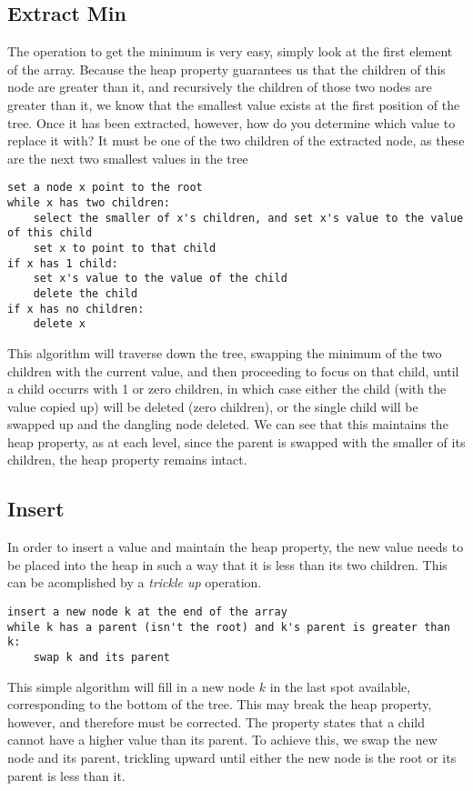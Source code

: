 \documentclass[titlepage]{article}
\numberwithin{equation}{subsection}
\begin{document}
\subsection{Extract Min}
The operation to get the minimum is very easy, simply look at the first element of the array. Because the
heap property guarantees us that the children of this node are greater than it, and recursively the children
of those two nodes are greater than it, we know that the smallest value exists at the first position of the
tree. Once it has been extracted, however, how do you determine which value to replace it with? It must be
one of the two children of the extracted node, as these are the next two smallest values in the tree
\begin{minipage}{\linewidth}
\begin{lstlisting}
set a node x point to the root
while x has two children:
    select the smaller of x's children, and set x's value to the value of this child
    set x to point to that child
if x has 1 child:
    set x's value to the value of the child
    delete the child
if x has no children:
    delete x
\end{lstlisting}
\end{minipage}
This algorithm will traverse down the tree, swapping the minimum of the two children with the current value,
and then proceeding to focus on that child, until a child occurrs with 1 or zero children, in which case either
the child (with the value copied up) will be deleted (zero children), or the single child will be swapped up
and the dangling node deleted. We can see that this maintains the heap property, as at each level, since the
parent is swapped with the smaller of its children, the heap property remains intact. 
\subsection{Insert}
In order to insert a value and maintain the heap property, the new value needs to be placed into the heap
in such a way that it is less than its two children. This can be acomplished by a \textit{trickle up} operation.
\begin{lstlisting}
insert a new node k at the end of the array
while k has a parent (isn't the root) and k's parent is greater than k:
    swap k and its parent
\end{lstlisting}
This simple algorithm will fill in a new node $k$ in the last spot available, corresponding to the 
bottom of the tree. This may break the heap property, however, and therefore must be corrected. The property
states that a child cannot have a higher value than its parent. To achieve this, we swap the new node and its
parent, trickling upward until either the new node is the root or its parent is less than it.
\end{document}
